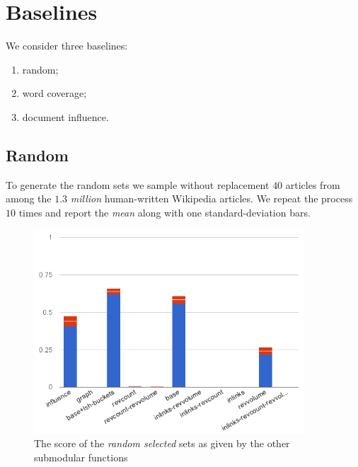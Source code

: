 \section{Baselines}

We consider three baselines:
\begin{enumerate}
  \item random;
  \item word coverage;
  \item document influence.
\end{enumerate}

\subsection{Random}

To generate the random sets we sample without replacement \(40\) articles from
among the \(1.3\) \emph{million} human-written Wikipedia articles. We repeat
the process \(10\) times and report the \emph{mean} along with one
standard-deviation bars.

\begin{figure}
  \centering
  \includegraphics[width=0.9\textwidth,natwidth=555,natheight=419]{images/rand-mean.png}
  \caption{The score of the \emph{random selected} sets as given by the other
  submodular functions}
  \label{img:rand-mean}
\end{figure}

